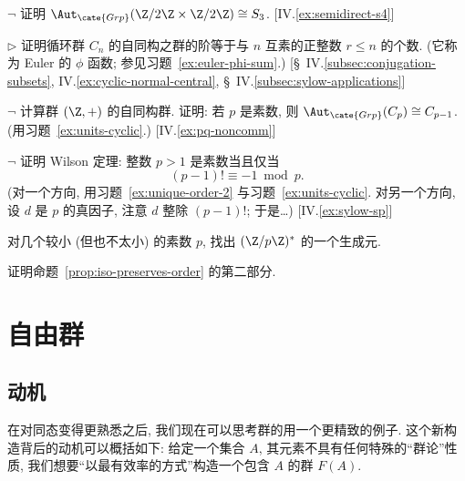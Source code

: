 \begin{prob}
\label{ex:aut-v4}
$\neg$ 证明 $\Aut_{\cate{Grp}}(\Z/2\Z \times \Z/2\Z) \cong S_3$. [IV.\ref{ex:semidirect-s4}]
\end{prob}

\begin{prob}
\label{ex:aut-cyclic-phi}
$\triangleright$ 证明循环群 $C_n$ 的自同构之群的阶等于与 $n$ 互素的正整数 $r \leq n$ 的个数. (它称为 Euler 的 $\phi$ 函数; 参见习题~\ref{ex:euler-phi-sum}.) [\S~IV.\ref{subsec:conjugation-subsets}, IV.\ref{ex:cyclic-normal-central}, \S~IV.\ref{subsec:sylow-applications}]
\end{prob}

\begin{prob}
\label{ex:aut-z}
$\neg$ 计算群 $(\Z, +)$ 的自同构群. 证明: 若 $p$ 是素数, 则 $\Aut_{\cate{Grp}}(C_p) \cong C_{p-1}$. (用习题~\ref{ex:units-cyclic}.) [IV.\ref{ex:pq-noncomm}]
\end{prob}

\begin{prob}
\label{ex:wilson}
$\neg$ 证明 Wilson 定理: 整数 $p>1$ 是素数当且仅当
\[
(p-1)! \equiv -1 \bmod p.
\]
(对一个方向, 用习题~\ref{ex:unique-order-2} 与习题~\ref{ex:units-cyclic}. 对另一个方向, 设 $d$ 是 $p$ 的真因子, 注意 $d$ 整除 $(p-1)!$; 于是\ldots) [IV.\ref{ex:sylow-sp}]
\end{prob}

\begin{prob}
\label{ex:generators-zp}
对几个较小 (但也不太小) 的素数 $p$, 找出 $(\Z/p\Z)^{*}$ 的一个生成元.
\end{prob}

\begin{prob}
\label{ex:prop-4-8-second}
证明命题~\ref{prop:iso-preserves-order} 的第二部分.
\end{prob}

\section{自由群}
\label{subsec:free-groups}

\subsection{动机}
\label{subsec:free-motivation}

在对同态变得更熟悉之后, 我们现在可以思考群的用一个更精致的例子. 这个新构造背后的动机可以概括如下: 给定一个集合 $A$, 其元素不具有任何特殊的``群论''性质, 我们想要``以最有效率的方式''构造一个包含 $A$ 的群 $F(A)$.

